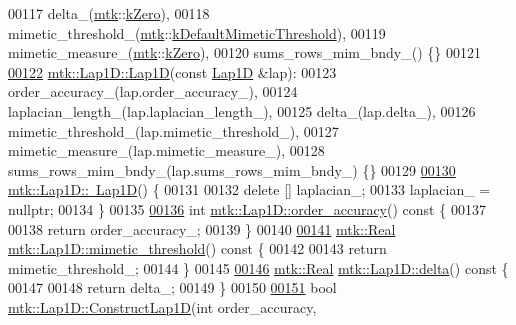 \begin{DoxyCode}
00117   delta\_(\hyperlink{namespacemtk}{mtk}::\hyperlink{group__c01-roots_ga59a451a5fae30d59649bcda274fea271}{kZero}),
00118   mimetic\_threshold\_(\hyperlink{namespacemtk}{mtk}::\hyperlink{group__c01-roots_ga35718d949bdc81a08a9cc8ebbe3478a2}{kDefaultMimeticThreshold}),
00119   mimetic\_measure\_(\hyperlink{namespacemtk}{mtk}::\hyperlink{group__c01-roots_ga59a451a5fae30d59649bcda274fea271}{kZero}),
00120   sums\_rows\_mim\_bndy\_() \{\}
00121 
\hypertarget{mtk__lap__1d_8cc_source_l00122}{}\hyperlink{classmtk_1_1Lap1D_a95c3fdcd0c9e4c56e775a2a20a2fac42}{00122} \hyperlink{classmtk_1_1Lap1D_a6fc2aeea35d4dfa49f17e625411f5a70}{mtk::Lap1D::Lap1D}(\textcolor{keyword}{const} \hyperlink{classmtk_1_1Lap1D}{Lap1D} &lap):
00123   order\_accuracy\_(lap.order\_accuracy\_),
00124   laplacian\_length\_(lap.laplacian\_length\_),
00125   delta\_(lap.delta\_),
00126   mimetic\_threshold\_(lap.mimetic\_threshold\_),
00127   mimetic\_measure\_(lap.mimetic\_measure\_),
00128   sums\_rows\_mim\_bndy\_(lap.sums\_rows\_mim\_bndy\_) \{\}
00129 
\hypertarget{mtk__lap__1d_8cc_source_l00130}{}\hyperlink{classmtk_1_1Lap1D_ac0cb868243a66658cc46de5b818fa4e8}{00130} \hyperlink{classmtk_1_1Lap1D_ac0cb868243a66658cc46de5b818fa4e8}{mtk::Lap1D::~Lap1D}() \{
00131 
00132   \textcolor{keyword}{delete} [] laplacian\_;
00133   laplacian\_ = \textcolor{keyword}{nullptr};
00134 \}
00135 
\hypertarget{mtk__lap__1d_8cc_source_l00136}{}\hyperlink{classmtk_1_1Lap1D_ae3490534a9e950df3f81b3840c31b13a}{00136} \textcolor{keywordtype}{int} \hyperlink{classmtk_1_1Lap1D_ae3490534a9e950df3f81b3840c31b13a}{mtk::Lap1D::order\_accuracy}()\textcolor{keyword}{ const }\{
00137 
00138   \textcolor{keywordflow}{return} order\_accuracy\_;
00139 \}
00140 
\hypertarget{mtk__lap__1d_8cc_source_l00141}{}\hyperlink{classmtk_1_1Lap1D_a957ae4ff6053d605ac7b93650ad6f188}{00141} \hyperlink{group__c01-roots_gac080bbbf5cbb5502c9f00405f894857d}{mtk::Real} \hyperlink{classmtk_1_1Lap1D_a957ae4ff6053d605ac7b93650ad6f188}{mtk::Lap1D::mimetic\_threshold}()\textcolor{keyword}{ const }\{
00142 
00143   \textcolor{keywordflow}{return} mimetic\_threshold\_;
00144 \}
00145 
\hypertarget{mtk__lap__1d_8cc_source_l00146}{}\hyperlink{classmtk_1_1Lap1D_a4e16e80c6dd845ac42bda23385a1c56e}{00146} \hyperlink{group__c01-roots_gac080bbbf5cbb5502c9f00405f894857d}{mtk::Real} \hyperlink{classmtk_1_1Lap1D_a4e16e80c6dd845ac42bda23385a1c56e}{mtk::Lap1D::delta}()\textcolor{keyword}{ const }\{
00147 
00148   \textcolor{keywordflow}{return} delta\_;
00149 \}
00150 
\hypertarget{mtk__lap__1d_8cc_source_l00151}{}\hyperlink{classmtk_1_1Lap1D_a685dcba88c08cf5b7b6c2aa4669a472c}{00151} \textcolor{keywordtype}{bool} \hyperlink{classmtk_1_1Lap1D_a685dcba88c08cf5b7b6c2aa4669a472c}{mtk::Lap1D::ConstructLap1D}(\textcolor{keywordtype}{int} order\_accuracy,

\end{DoxyCode}
